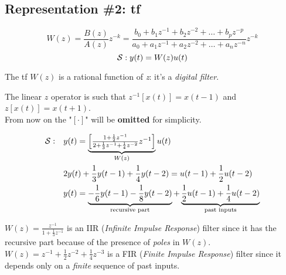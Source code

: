 
\subsection{Representation \#2: \acrfull{tf}}

\[
    W(z) = \frac{B(z)}{A(z)} z^{-k} = \frac{b_0 + b_1z^{-1} + b_2z^{-2} + \ldots + b_pz^{-p}}{a_0 + a_1z^{-1} + a_2z^{-2} + \ldots + a_nz^{-n}} z^{-k} 
\]
\vspace{1pt}
\[
     \mathcal{S}: y(t) = W(z)u(t)
\]     

The \gls{tf} $W(z)$ is a rational function of \emph{z}: it's a \emph{digital filter}.\\

\begin{rem}[$z$ operator]
    The linear $z$ operator is such that $z^{-1}[x(t)]=x(t-1)$ and $z[x(t)]=x(t+1)$.\\
    From now on the "$[\cdot]$" will be \textbf{omitted} for simplicity.
\end{rem}


\begin{exa}
    \begin{align*}
    \mathcal{S}: \quad
        & y(t) = \underbrace{\begin{bmatrix}
            \frac{1+\frac{1}{2}z^{-1}}{2+\frac{1}{3}z^{-1}+\frac{1}{4}z^{-2}} z^{-1}
        \end{bmatrix}}_{W(z)} u(t) \\
        & 2y(t) + \frac{1}{3}y(t-1) + \frac{1}{4}y(t-2) = u(t-1) + \frac{1}{2}u(t-2) \\
        & y(t) = \underbrace{-\frac{1}{6}y(t-1) - \frac{1}{8}y(t-2)}_\text{recursive part} + \underbrace{\frac{1}{2}u(t-1) + \frac{1}{4}u(t-2)}_\text{past inputs}
    \end{align*}

\end{exa}
\begin{rem}
\hfill \break 
    $\displaystyle W(z) = \frac{z^{-1}}{1 + \frac{1}{3}z^{-1}}$ is an IIR (\emph{Infinite Impulse Response}) filter since it has the recursive part because of the presence of \emph{poles} in $W(z)$.\\
    $\displaystyle W(z) = z^{-1} + \frac{1}{2}z^{-2} + \frac{1}{4}z^{-3}$ is a FIR (\emph{Finite Impulse Response}) filter since it depends only on a \emph{finite} sequence of past inputs.
\end{rem}

